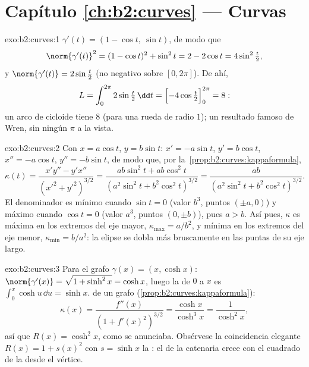 \section*{Capítulo \ref{ch:b2:curves} --- Curvas}

\begin{solution}{exo:b2:curves:1}
$\gamma'(t) = (1 - \cos t,\ \sin t)$, de modo que
\[
\norm{\gamma'(t)}^2 = (1 - \cos t)^2 + \sin^2 t
= 2 - 2\cos t = 4\sin^2\tfrac t2 ,
\]
y $\norm{\gamma'(t)} = 2\sin\frac t2$ (no negativo sobre $[0,
2\pi]$). De ahí,
\[
L = \int_0^{2\pi} 2\sin\tfrac t2\,\dd t
= \Bigl[-4\cos\tfrac t2\Bigr]_0^{2\pi} = 8 :
\]
un arco de cicloide tiene  $8$ (para una rueda de radio $1$);
un resultado famoso de Wren, sin ningún $\pi$ a la vista.
\end{solution}

\begin{solution}{exo:b2:curves:2}
Con $x = a\cos t$, $y = b\sin t$: $x' = -a\sin t$, $y' = b\cos t$,
$x'' = -a\cos t$, $y'' = -b\sin t$, de modo que, por la~\cref{prop:b2:curves:kappaformula},
\[
\kappa(t)
= \frac{x'y'' - y'x''}{(x'^2 + y'^2)^{3/2}}
= \frac{ab\sin^2 t + ab\cos^2 t}
       {(a^2\sin^2 t + b^2\cos^2 t)^{3/2}}
= \frac{ab}{(a^2\sin^2 t + b^2\cos^2 t)^{3/2}} .
\]
El denominador es mínimo cuando $\sin t = 0$ (valor $b^3$, puntos
$(\pm a, 0)$) y máximo cuando $\cos t = 0$ (valor $a^3$, puntos $(0,
\pm b)$), pues $a > b$. Así pues, $\kappa$ es máxima en los extremos
del eje mayor, $\kappa_{\max} = a/b^2$, y mínima en los extremos del
eje menor, $\kappa_{\min} = b/a^2$: la elipse se dobla más
bruscamente en las puntas de su eje largo.
\end{solution}

\begin{solution}{exo:b2:curves:3}
Para el grafo $\gamma(x) = (x, \cosh x)$: $\norm{\gamma'(x)} =
\sqrt{1 + \sinh^2 x} = \cosh x$, luego la  de $0$ a
$x$ es $\int_0^x \cosh u\,\dd u = \sinh x$.  de un grafo
(\cref{prop:b2:curves:kappaformula}):
\[
\kappa(x) = \frac{f''(x)}{(1 + f'(x)^2)^{3/2}}
= \frac{\cosh x}{\cosh^3 x} = \frac{1}{\cosh^2 x} ,
\]
así que $R(x) = \cosh^2 x$, como se anunciaba. Obsérvese la
coincidencia elegante $R(x) = 1 + s(x)^2$ con $s = \sinh x$ la
: el  de la catenaria crece con
el cuadrado de la  desde el vértice.
\end{solution}

